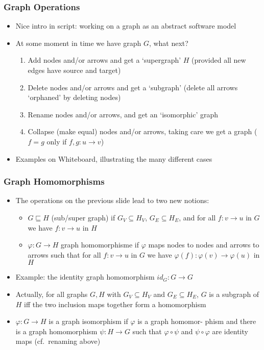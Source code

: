 \documentclass[handout]{beamer}
\begin{document}
\frame
  {   
    \frametitle{Graph Operations}\label{Ch1:GraphOps}

 \begin{itemize}[<+->]
\item Nice intro in script: working on a graph as an abstract software model
\item At some moment in time we have graph $G$, what next?
   \begin{enumerate}[<+->]
\item Add nodes and/or arrows and get a `supergraph' $H$ (provided all new edges
have source and target)
\item Delete nodes and/or arrows and get a `subgraph'
(delete all arrows `orphaned' by deleting nodes)
\item Rename nodes and/or arrows, and get an `isomorphic' graph
\item Collapse (make equal) nodes and/or arrows, taking care we get a graph
($f=g$ only if $f,g: u\to v$)
   \end{enumerate}
\item Examples on Whiteboard, illustrating the many different cases
 \end{itemize}

 }

\frame
  {   
    \frametitle{Graph Homomorphisms}\label{Ch1:GraphHoms}

 \begin{itemize}[<+->]
\item The operations on the previous slide lead to two new notions:
 \begin{itemize}[<+->]
\item $G\sqsubseteq H$ (sub/super graph) if $G_V\subseteq H_V$, $G_E\subseteq H_E$,
and for all $f: v\to u$ in $G$ we have $f: v\to u$ in $H$
\item $\varphi: G\to H$ graph homomorphisme if $\varphi$ maps nodes to nodes and arrows
to arrows such that for all $f: v\to u$ in $G$ we have $\varphi(f): \varphi(v)\to \varphi(u)$ in $H$
 \end{itemize}
\item Example: the identity graph homomorphism $id_G : G\to G$
\item Actually, for all graphs $G,H$ with $G_V \subseteq H_V$ and $G_E \subseteq H_E$, 
$G$ is a subgraph of $H$
iff the two inclusion maps together form a homomorphism
\item $\varphi: G\to H$ is a graph isomorphism if $\varphi$ is a graph
homomor- phism and there is  a graph homomorphism $\psi: H\to G$ such that
$\varphi\circ\psi$ and $\psi\circ\varphi$ are identity maps (cf.\ renaming above) 
 \end{itemize}

 }
\end{document}
